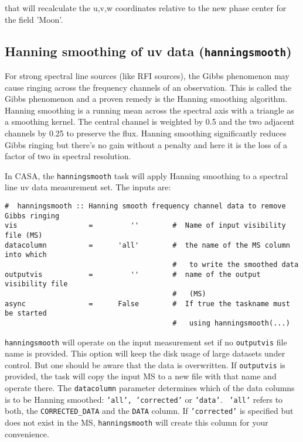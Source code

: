 that will recalculate the u,v,w coordinates relative to the new phase
center for the field 'Moon'.



\subsection{Hanning smoothing of uv data ({\tt hanningsmooth})}
\label{section:cal.other.hanningsmooth}

For strong spectral line sources (like RFI sources), the Gibbs
phenomenon may cause ringing across the frequency channels of an
observation. This is called the Gibbs phenomenon and a proven remedy is
the Hanning smoothing algorithm. Hanning smoothing is a running mean
across the spectral axis with a triangle as a smoothing kernel. The
central channel is weighted by 0.5 and the two adjacent channels by
0.25 to preserve the flux. Hanning smoothing significantly reduces
Gibbs ringing but there's no gain without a penalty and here it is the
loss of a factor of two in spectral resolution.

In CASA, the {\tt hanningsmooth} task will apply Hanning smoothing to a
spectral line uv data measurement set.  The inputs are:

\small
\begin{verbatim}
#  hanningsmooth :: Hanning smooth frequency channel data to remove Gibbs ringing
vis                 =         ''        #  Name of input visibility file (MS)
datacolumn          =      'all'        #  the name of the MS column into which
                                        #   to write the smoothed data
outputvis           =         ''        #  name of the output visibility file
                                        #   (MS)
async               =      False        #  If true the taskname must be started
                                        #   using hanningsmooth(...)
\end{verbatim}
\normalsize

{\tt hanningsmooth} will operate on the input measurement set if no
{\tt outputvis} file name is provided. This option will keep the disk
usage of large datasets under control. But one should be aware that
the data is overwritten. If {\tt outputvis} is provided, the task will
copy the input MS to a new file with that name and operate there. The
{\tt datacolumn} parameter determines which of the data columns is to
be Hanning smoothed: {\tt 'all', 'corrected'} or {\tt 'data'}. {\tt
  'all'} refers to both, the {\tt CORRECTED\_DATA} and the {\tt DATA}
column. If {\tt 'corrected'} is specified but does not exist in the
MS, {\tt hanningsmooth} will create this column for your convenience.


